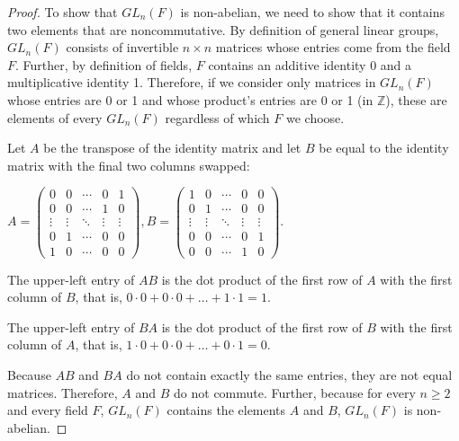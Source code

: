 \documentclass{article}
\begin{document}
\begin{proof}
    To show that $GL_n(F)$ is non-abelian, we need to show that it contains two elements that are noncommutative. By definition of general linear groups, $GL_n(F)$ consists of invertible $n \times n$ matrices whose entries come from the field $F$. Further, by definition of fields, $F$ contains an additive identity 0 and a multiplicative identity 1. Therefore, if we consider only matrices in $GL_n(F)$ whose entries are 0 or 1 and whose product's entries are 0 or 1 (in $\mathbb{Z}$), these are elements of every $GL_n(F)$ regardless of which $F$ we choose.

    Let $A$ be the transpose of the identity matrix and let $B$ be equal to the identity matrix with the final two columns swapped:
    
    $A = \begin{pmatrix}
        0 & 0 & \cdots & 0 & 1\\
        0 & 0 & \cdots & 1 & 0\\
        \vdots & \vdots & \ddots & \vdots & \vdots \\
        0 & 1 & \cdots & 0 & 0\\
        1 & 0 & \cdots & 0 & 0
    \end{pmatrix}, 
    B = \begin{pmatrix}
        1 & 0 & \cdots & 0 & 0\\
        0 & 1 & \cdots & 0 & 0\\
        \vdots & \vdots & \ddots & \vdots & \vdots \\
        0 & 0 & \cdots & 0 & 1\\
        0 & 0 & \cdots & 1 & 0
    \end{pmatrix}$.

    The upper-left entry of $AB$ is the dot product of the first row of $A$ with the first column of $B$, that is, $0 \cdot 0 + 0 \cdot 0 + \ldots + 1 \cdot 1 = 1$.

    The upper-left entry of $BA$ is the dot product of the first row of $B$ with the first column of $A$, that is, $1 \cdot 0 + 0 \cdot 0 + \ldots + 0 \cdot 1 = 0$.

    Because $AB$ and $BA$ do not contain exactly the same entries, they are not equal matrices. Therefore, $A$ and $B$ do not commute. Further, because for every $n \geq 2$ and every field $F$, $GL_n(F)$ contains the elements $A$ and $B$, $GL_n(F)$ is non-abelian.
\end{proof}
\end{document}
